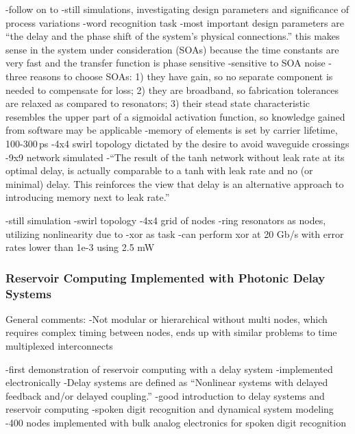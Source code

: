 \cite{vada2011}
-follow on to \cite{vadi2008}
-still simulations, investigating design parameters and significance of process variations
-word recognition task
-most important design parameters are ``the delay and the phase shift of the system's physical connections.'' this makes sense in the system under consideration (SOAs) because the time constants are very fast and the transfer function is phase sensitive
-sensitive to SOA noise
-three reasons to choose SOAs: 1) they have gain, so no separate component is needed to compensate for loss; 2) they are broadband, so fabrication tolerances are relaxed as compared to resonators; 3) their stead state characteristic resembles the upper part of a sigmoidal activation function, so knowledge gained from software may be applicable
-memory of elements is set by carrier lifetime, 100-300\,ps
-4x4 swirl topology dictated by the desire to avoid waveguide crossings
-9x9 network simulated
-``The result of the tanh network without leak rate at its optimal delay, is actually comparable to a tanh with leak rate and no (or minimal) delay. This reinforces the view that delay is an alternative approach to introducing memory next to leak rate.''

\cite{desc2018}
-still simulation
-swirl topology
-4x4 grid of nodes
-ring resonators as nodes, utilizing nonlinearity due to
-xor as task
-can perform xor at 20 Gb/s with error rates lower than 1e-3 using 2.5 mW

\vspace{3em}
\cite{anha2017}

\subsubsection{Reservoir Computing Implemented with Photonic Delay Systems}
General comments:
-Not modular or hierarchical without multi nodes, which requires complex timing between nodes, ends up with similar problems to time multiplexed interconnects

\vspace{3em}
\cite{apso2011}
-first demonstration of reservoir computing with a delay system
-implemented electronically
-Delay systems are defined as ``Nonlinear systems with delayed feedback and/or delayed coupling.''
-good introduction to delay systems and reservoir computing
-spoken digit recognition and dynamical system modeling
-400 nodes implemented with bulk analog electronics for spoken digit recognition

